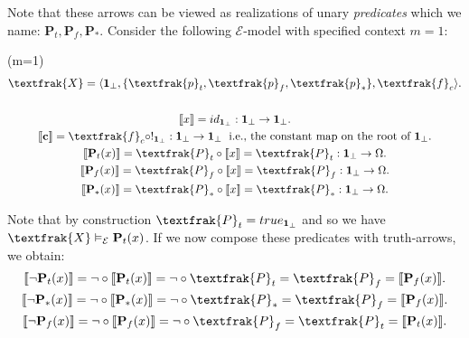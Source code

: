 Note that these arrows can be viewed as realizations of unary \emph{predicates} which we name: $\textbf{P}_t,\textbf{P}_f,\textbf{P}_*$. 
\newline
Consider the following $\mathcal{E}$-model  with specified context $m = 1$:
\begin{ex} (m=1)
	\begin{gather*}
		\textfrak{X}= \langle \textbf{1}_\bot, \{\textfrak{p}_t, \textfrak{p}_f, \textfrak{p}_*\}, \textfrak{f}_c \rangle. \\ \\
		\llbracket x \rrbracket = id_{\textbf{1}_\bot}: \textbf{1}_\bot \rightarrow \textbf{1}_\bot. \\ \llbracket \textbf{c} \rrbracket = \textfrak{f}_c \circ !_{\textbf{1}_\bot} : \textbf{1}_\bot \rightarrow \textbf{1}_\bot \; \text{ i.e., the constant map on the root of $\textbf{1}_\bot$}.  \\
		\llbracket \textbf{P}_t (x) \rrbracket = \textfrak{P}_t \circ \llbracket x \rrbracket = \textfrak{P}_t : \textbf{1}_\bot \rightarrow \Omega.\\
		\llbracket \textbf{P}_f (x) \rrbracket = \textfrak{P}_f \circ \llbracket x \rrbracket = \textfrak{P}_f : \textbf{1}_\bot \rightarrow \Omega.\\
		\llbracket \textbf{P}_* (x) \rrbracket = \textfrak{P}_* \circ \llbracket x \rrbracket = \textfrak{P}_* : \textbf{1}_\bot \rightarrow \Omega. 
	\end{gather*}
\end{ex}
Note that by construction $\textfrak{P}_t = true_{\textbf{1}_\bot}$ and so we have $\textfrak{X} \vDash_\mathcal{E} \textbf{P}_t(x) $. 
\newline
If we now compose these predicates with truth-arrows, we obtain:
\begin{gather*}
	\llbracket \neg \textbf{P}_t (x) \rrbracket = \neg \circ \llbracket \textbf{P}_t (x) \rrbracket = \neg \circ  \textfrak{P}_t = \textfrak{P}_f = \llbracket \textbf{P}_f (x) \rrbracket.\\
	\llbracket \neg \textbf{P}_* (x) \rrbracket = \neg \circ \llbracket \textbf{P}_* (x) \rrbracket = \neg \circ  \textfrak{P}_* = \textfrak{P}_f = \llbracket \textbf{P}_f (x) \rrbracket.\\
	\llbracket \neg \textbf{P}_f (x) \rrbracket = \neg \circ \llbracket \textbf{P}_f (x) \rrbracket = \neg \circ  \textfrak{P}_f = \textfrak{P}_t = \llbracket \textbf{P}_t (x) \rrbracket.
\end{gather*}

